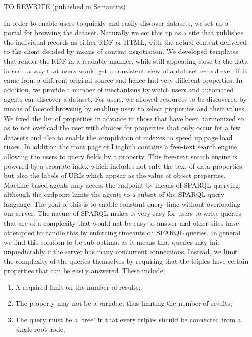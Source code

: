 \documentclass[smallextended]{svjour3}       %
\begin{document}
TO REWRITE (published in Semantics)

In order to enable users to quickly and easily discover datasets, we set up a 
portal for browsing the dataset. Naturally we set this up as a site that publishes
the individual records as either RDF or HTML, with the actual content delivered
to the client decided by means of content negotiation. We developed 
templates that render the RDF in a readable manner, while still appearing close
to the data in such a way that users would get a consistent view of a dataset record even
if it came from a different original source and hence had very different
properties.
In addition, we provide a 
number of mechanisms by which users and automated agents can discover a dataset.
For users, we allowed resources to be discovered by means of faceted browsing by
enabling users to select properties and their values. We fixed the list of
properties in advance to those that have been harmonized so as to not overload
the user with choices for properties that only occur for a few datasets and also
to enable the compilation of indexes to speed up page load times. In addition the
front page of Linghub contains a free-text search engine allowing the users to
query fields by a property. This free-text search engine is powered by a
separate index which includes not only the text of data properties but also the
labels of URIs which appear as the value of object properties. 
Machine-based agents may access
the endpoint by means of SPARQL querying, although the endpoint limits the agents
to a subset of the SPARQL query language. The goal of this is to enable constant
query-time without overloading our server. The nature of SPARQL makes it very
easy for users to write queries that are of a complexity that would not be easy
to answer and other sites have attempted to handle this by enforcing timeouts on
SPARQL queries. In general we find this solution to be sub-optimal as it
means that queries may fail unpredictably if the server has many concurrent
connections. Instead, we limit the complexity of the queries themselves by
requiring that the triples have certain properties that can be easily answered.
These include:

\begin{enumerate}
    \item A required limit on the number of results;
    \item The property may not be a variable, thus limiting the number of
        results;
    \item The query must be a `tree' in that every triples should be connected
        from a single root node.
\end{enumerate}
\end{document}

